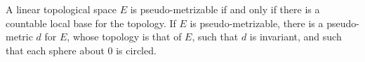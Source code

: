 A linear topological space $E$ is pseudo-metrizable if and only if there is a countable local base for the topology. If $E$ is pseudo-metrizable, there is a pseudo-metric $d$ for $E$, whose topology is that of $E$, such that $d$ is invariant, and such that each sphere about $0$ is circled.
